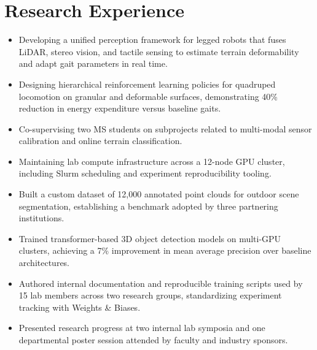 \documentclass{slate-resume}
\begin{document}
\section{Research Experience}
\begin{entryblock}
\begin{itemize}
  \item Developing a unified perception framework for legged robots that fuses LiDAR, stereo vision, and tactile sensing to estimate terrain deformability and adapt gait parameters in real time.
  \item Designing hierarchical reinforcement learning policies for quadruped locomotion on granular and deformable surfaces, demonstrating 40\% reduction in energy expenditure versus baseline gaits.
  \item Co-supervising two MS students on subprojects related to multi-modal sensor calibration and online terrain classification.
  \item Maintaining lab compute infrastructure across a 12-node GPU cluster, including Slurm scheduling and experiment reproducibility tooling.
\end{itemize}
\end{entryblock}
\entrygap
\begin{entryblock}
\begin{itemize}
  \item Built a custom dataset of 12,000 annotated point clouds for outdoor scene segmentation, establishing a benchmark adopted by three partnering institutions.
  \item Trained transformer-based 3D object detection models on multi-GPU clusters, achieving a 7\% improvement in mean average precision over baseline architectures.
  \item Authored internal documentation and reproducible training scripts used by 15 lab members across two research groups, standardizing experiment tracking with Weights \& Biases.
  \item Presented research progress at two internal lab symposia and one departmental poster session attended by faculty and industry sponsors.
\end{itemize}
\end{entryblock}
\entrygap
\end{document}

